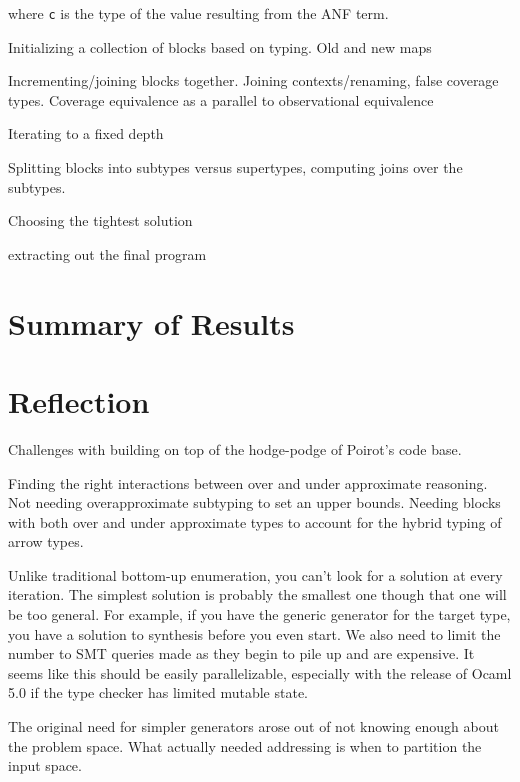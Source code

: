 \documentclass[review, sigplan]{acmart}
\begin{document}
where \lstinline|c| is the type of the value resulting from the
ANF term.

Initializing a collection of blocks based on typing. Old and new maps

Incrementing/joining blocks together. Joining contexts/renaming, false coverage
types. Coverage equivalence as a parallel to observational equivalence

Iterating to a fixed depth

Splitting blocks into subtypes versus supertypes, computing joins over the
subtypes.

Choosing the tightest solution

extracting out the final program

\section{Summary of Results}

\section{Reflection}

Challenges with building on top of the hodge-podge of Poirot's code base.

Finding the right interactions between over and under approximate reasoning. Not
needing overapproximate subtyping to set an upper bounds. Needing blocks with
both over and under approximate types to account for the hybrid typing of arrow
types.

Unlike traditional bottom-up enumeration, you can't look for a solution at every
iteration. The simplest solution is probably the smallest one though that one will
be too general. For example, if you have the generic generator for the target
type, you have a solution to synthesis before you even start. We also need to
limit the number to SMT queries made as they begin to pile up and are expensive.
It seems like this should be easily parallelizable, especially with the release
of Ocaml 5.0 if the type checker has limited mutable state.

The original need for simpler generators arose out of not knowing enough about
the problem space. What actually needed addressing is when to partition the
input space.
\end{document}
